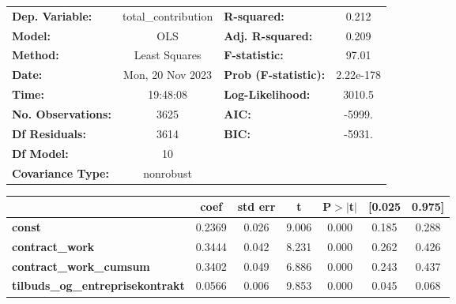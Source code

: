 \begin{center}
\begin{tabular}{lclc}
\toprule
\textbf{Dep. Variable:}                  & total\_contribution & \textbf{  R-squared:         } &     0.212   \\
\textbf{Model:}                          &         OLS         & \textbf{  Adj. R-squared:    } &     0.209   \\
\textbf{Method:}                         &    Least Squares    & \textbf{  F-statistic:       } &     97.01   \\
\textbf{Date:}                           &   Mon, 20 Nov 2023  & \textbf{  Prob (F-statistic):} & 2.22e-178   \\
\textbf{Time:}                           &       19:48:08      & \textbf{  Log-Likelihood:    } &    3010.5   \\
\textbf{No. Observations:}               &          3625       & \textbf{  AIC:               } &    -5999.   \\
\textbf{Df Residuals:}                   &          3614       & \textbf{  BIC:               } &    -5931.   \\
\textbf{Df Model:}                       &            10       & \textbf{                     } &             \\
\textbf{Covariance Type:}                &      nonrobust      & \textbf{                     } &             \\
\bottomrule
\end{tabular}
\begin{tabular}{lcccccc}
                                         & \textbf{coef} & \textbf{std err} & \textbf{t} & \textbf{P$> |$t$|$} & \textbf{[0.025} & \textbf{0.975]}  \\
\midrule
\textbf{const}                           &       0.2369  &        0.026     &     9.006  &         0.000        &        0.185    &        0.288     \\
\textbf{contract\_work}                  &       0.3444  &        0.042     &     8.231  &         0.000        &        0.262    &        0.426     \\
\textbf{contract\_work\_cumsum}          &       0.3402  &        0.049     &     6.886  &         0.000        &        0.243    &        0.437     \\
\textbf{tilbuds\_og\_entreprisekontrakt} &       0.0566  &        0.006     &     9.853  &         0.000        &        0.045    &        0.068     \\

\end{tabular}
\end{center}

